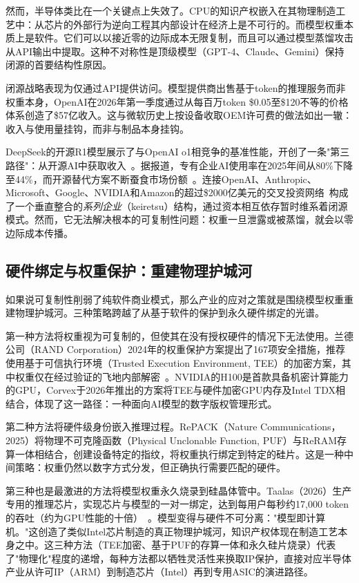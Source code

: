 然而，半导体类比在一个关键点上失效了。CPU的知识产权嵌入在其物理制造工艺中：从芯片的外部行为逆向工程其内部设计在经济上是不可行的。而模型权重本质上是软件。它们可以以接近零的边际成本无限复制，而且可以通过模型蒸馏攻击从API输出中提取。这种不对称性是顶级模型（GPT-4、Claude、Gemini）保持闭源的首要结构性原因。

闭源战略表现为仅通过API提供访问。模型提供商出售基于token的推理服务而非权重本身，OpenAI在2026年第一季度通过从每百万token \$0.05至\$120不等的价格体系创造了\$57亿收入。这与微软历史上按设备收取OEM许可费的做法如出一辙：收入与使用量挂钩，而非与制品本身挂钩。

DeepSeek的开源R1模型展示了与OpenAI o1相竞争的基准性能，开创了一条"第三路径"：从开源AI中获取收入~\cite{thirdbridge2025deepseek}。据报道，专有企业AI使用率在2025年间从80\%下降至44\%，而开源替代方案不断蚕食市场份额~\cite{mckinsey2025aisurvey}。连接OpenAI、Anthropic、Microsoft、Google、NVIDIA和Amazon的超过\$2000亿美元的交叉投资网络~\cite{brookings2025aicustomers}构成了一个垂直整合的\textit{系列企业}（keiretsu）结构，通过资本相互依存暂时维系着闭源模式。然而，它无法解决根本的可复制性问题：权重一旦泄露或被蒸馏，就会以零边际成本传播。

\subsection{硬件绑定与权重保护：重建物理护城河}
\label{sec:hardware-binding}

如果说可复制性削弱了纯软件商业模式，那么产业的应对之策就是围绕模型权重重建物理护城河。三种策略跨越了从基于软件的保护到永久硬件绑定的光谱。

第一种方法将权重视为可复制的，但使其在没有授权硬件的情况下无法使用。兰德公司（RAND Corporation）2024年的权重保护方案提出了167项安全措施，推荐使用基于可信执行环境（Trusted Execution Environment, TEE）的加密方案，其中权重仅在经过验证的飞地内部解密~\cite{rand2024weightplaybook}。NVIDIA的H100是首款具备机密计算能力的GPU，Corvex于2026年推出的方案将TEE与硬件加密GPU内存及Intel TDX相结合，体现了这一路径：一种面向AI模型的数字版权管理形式。

第二种方法将硬件级身份嵌入推理过程。RePACK（Nature Communications，2025）将物理不可克隆函数（Physical Unclonable Function, PUF）与ReRAM存算一体相结合，创建设备特定的指纹，将权重执行绑定到特定的硅片。这是一种中间策略：权重仍然以数字方式分发，但正确执行需要匹配的硬件。

第三种也是最激进的方法将模型权重永久烧录到硅晶体管中。Taalas（2026）生产专用的推理芯片，实现芯片与模型的一对一绑定，达到每用户每秒约17,000 token的吞吐（约为GPU性能的十倍）~\cite{taalas_2026_hc1}。模型变得与硬件不可分离："模型即计算机。"这创造了类似Intel芯片制造的真正物理护城河，知识产权体现在制造工艺本身之中。这三种方法（TEE加密、基于PUF的存算一体和永久硅片烧录）代表了"物理化"程度的递增，每种方法都以牺牲灵活性来换取IP保护，直接对应半导体产业从许可IP（ARM）到制造芯片（Intel）再到专用ASIC的演进路径。

